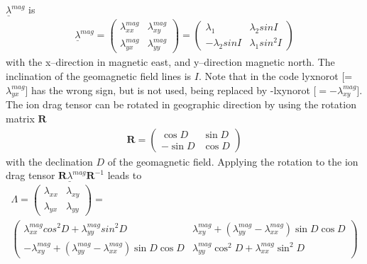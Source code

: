 $\underline{\lambda}^{mag}$ is
%
\begin{gather}
  \underline{\lambda}^{mag}=
   \begin{pmatrix}
      \lambda_{xx}^{mag} & \lambda_{xy}^{mag} \\
      \lambda_{yx}^{mag} & \lambda_{yy}^{mag}
   \end{pmatrix} =
   \begin{pmatrix}
      \lambda_1 & \lambda_{2}sin I\\
      -\lambda_2 sin I & \lambda_{1} sin^2 I
   \end{pmatrix}
\end{gather}
%
with the x--direction in magnetic east, and y--direction magnetic
north. The inclination of the geomagnetic
field lines is $I$. Note that in the code lyxnorot
[= $\lambda^{mag}_{yx}$] has the wrong sign, but is not used, being
replaced by -lxynorot [$= -\lambda^{mag}_{xy}$].  The
ion drag tensor can be rotated in geographic direction by using the
rotation matrix $\mathbf{R}$
%
\begin{gather}
   \mathbf{R} =
   \begin{pmatrix}
      \cos D & \sin D\\
     -\sin D & \cos D
   \end{pmatrix}
\end{gather}
%
with the declination $D$ of the geomagnetic field. Applying the
rotation to the ion drag tensor
$\mathbf{R}\underline{\lambda}^{mag}\mathbf{R}^{-1}$ leads to
%
\begin{gather}
  \Lambda =
   \begin{pmatrix}
  \lambda_{xx} & \lambda_{xy}  \\
  \lambda_{yx} & \lambda_{yy}
   \end{pmatrix}
      = \\
   \begin{pmatrix}
  \lambda_{xx}^{mag} cos^2 D + \lambda_{yy}^{mag}
  sin^2 D &  \lambda_{xy}^{mag} + (\lambda_{yy}^{mag}-
  \lambda_{xx}^{mag}) \sin D \cos D  \\
  -\lambda_{xy}^{mag} + (\lambda_{yy}^{mag}-
  \lambda_{xx}^{mag}) \sin D \cos D  & \lambda_{yy}^{mag} \cos^2 D + \lambda_{xx}^{mag}
  \sin^2 D
   \end{pmatrix}
\end{gather}
%
